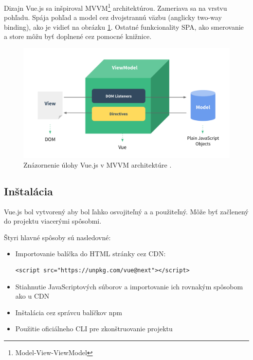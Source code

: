 Dizajn Vue.js sa inšpiroval MVVM\footnote{Model-View-ViewModel} architektúrou. Zameriava sa na vrstvu pohľadu. Spája pohľad a model cez dvojstrannú väzbu (anglicky two-way binding), ako je vidieť na obrázku \ref{pic:mvvm}. Ostatné funkcionality SPA, ako smerovanie a store môžu byť doplnené cez pomocné knižnice.
    \begin{figure}[!hbt]
        \centering
        \includegraphics[scale=0.2]{obrazky/mvvm.png}
        \caption{Znázornenie úlohy Vue.js v MVVM architektúre \cite{vue-guide}.}
        \label{pic:mvvm}
    \end{figure}

\subsection*{Inštalácia}
Vue.js bol vytvorený aby bol ľahko osvojiteľný a a použiteľný. Môže byť začlenený do projektu viacerými spôsobmi. 

Štyri hlavné spôsoby sú nasledovné:
    \begin{itemize}
        \item Importovanie balíčka do HTML stránky cez CDN:
        \begin{verbatim}<script src="https://unpkg.com/vue@next"></script>\end{verbatim}
        \item Stiahnutie JavaScriptových súborov a importovanie ich rovnakým spôsobom ako u CDN
        \item Inštalácia cez správcu balíčkov npm
        \item Použitie oficiálneho CLI pre zkonštruovanie projektu
    \end{itemize}
    
